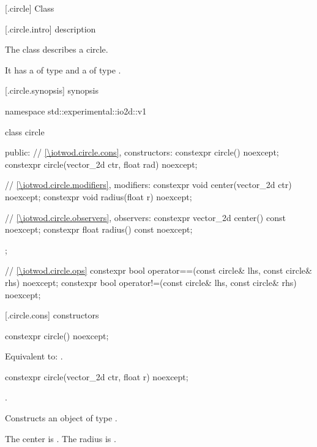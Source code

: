  [\iotwod.circle] {Class }

 [\iotwod.circle.intro] { description}

\pnum
{}%
The class  describes a circle.

\pnum
It has a  of type  and a  of type .

 [\iotwod.circle.synopsis] { synopsis}

\begin{codeblock}
namespace std::experimental::io2d::v1 {
  class circle {
  public:
    // \ref{\iotwod.circle.cons}, constructors:
    constexpr circle() noexcept;
    constexpr circle(vector_2d ctr, float rad) noexcept;

    // \ref{\iotwod.circle.modifiers}, modifiers:
    constexpr void center(vector_2d ctr) noexcept;
    constexpr void radius(float r) noexcept;
    
    // \ref{\iotwod.circle.observers}, observers:
    constexpr vector_2d center() const noexcept;
    constexpr float radius() const noexcept;
  };

  // \ref{\iotwod.circle.ops}  
  constexpr bool operator==(const circle& lhs, const circle& rhs) noexcept;
  constexpr bool operator!=(const circle& lhs, const circle& rhs) noexcept;
}
\end{codeblock}

 [\iotwod.circle.cons] { constructors}

%
\begin{itemdecl}
constexpr circle() noexcept;
\end{itemdecl}
\begin{itemdescr}
\pnum
\effects
Equivalent to: .
\end{itemdescr}

%
\begin{itemdecl}
constexpr circle(vector_2d ctr, float r) noexcept;
\end{itemdecl}
\begin{itemdescr}
\requires
{}.

\pnum
\effects
Constructs an object of type .

\pnum
The center is . The radius is .
\end{itemdescr}

